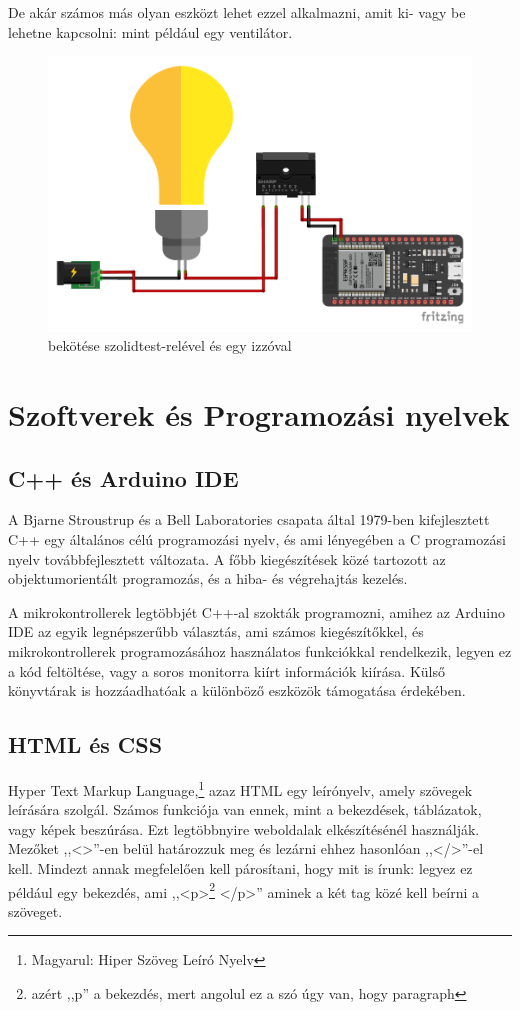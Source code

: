 \documentclass[
]{thesis-ekf}
\theoremstyle{definition}
\theoremstyle{remark}
\begin{document}
	De akár számos más olyan eszközt lehet ezzel alkalmazni, amit ki- vagy be lehetne kapcsolni: mint például egy ventilátor.
	
	\begin{figure}[ht!]
		\centering
		\includegraphics[width=16cm]{./img/ESP32 toggle schematics_bb}
		\caption{ bekötése szolidtest-relével és egy izzóval}
		\label{toggle-schematics}
	\end{figure}	
	
	\section{Szoftverek és Programozási nyelvek}
	\subsection{C++ és Arduino IDE}
	A Bjarne Stroustrup és a Bell Laboratories csapata által 1979-ben kifejlesztett C++ egy általános célú programozási nyelv, és ami lényegében a C programozási nyelv továbbfejlesztett változata. A főbb kiegészítések közé tartozott az objektumorientált programozás, és a hiba- és végrehajtás kezelés.\cite{cpp}
	
	A mikrokontrollerek legtöbbjét C++-al szokták programozni, amihez az Arduino IDE az egyik legnépszerűbb választás, ami számos kiegészítőkkel, és mikrokontrollerek programozásához használatos funkciókkal rendelkezik, legyen ez a kód feltöltése, vagy a soros monitorra kiírt információk kiírása. Külső könyvtárak is hozzáadhatóak a különböző eszközök támogatása érdekében. 
	
	\subsection{HTML és CSS}
	Hyper Text Markup Language,\footnote{Magyarul: Hiper Szöveg Leíró Nyelv} azaz HTML egy leírónyelv, amely szövegek leírására szolgál. Számos funkciója van ennek, mint a bekezdések, táblázatok, vagy képek beszúrása. Ezt legtöbbnyire weboldalak elkészítésénél használják. Mezőket ,,<>''-en belül határozzuk meg és lezárni ehhez hasonlóan ,,</>''-el kell. Mindezt annak megfelelően kell párosítani, hogy mit is írunk: legyez ez például egy bekezdés, ami ,,<p>\footnote{azért ,,p'' a bekezdés, mert angolul ez a szó úgy van, hogy paragraph} </p>'' aminek a két tag közé kell beírni a szöveget.
	
\end{document}
